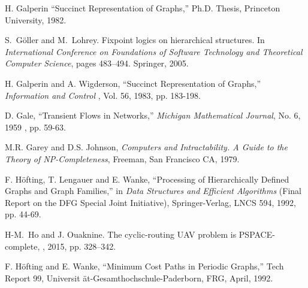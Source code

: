 \begin{thebibliography}{HMRR93}
 H. Galperin 
``Succinct Representation of Graphs,''
Ph.D. Thesis, Princeton University, 1982.


S.~G{\"o}ller and M.~Lohrey.
\newblock Fixpoint logics on hierarchical structures.
\newblock In {\em International Conference on Foundations of Software
  Technology and Theoretical Computer Science}, pages 483--494. Springer, 2005.



H. Galperin and A. Wigderson,
``Succinct Representation of Graphs,''
{\em Information and Control }, 
Vol. 56, 1983, pp. 183-198.






D. Gale,
``Transient Flows in Networks,''
{\em Michigan Mathematical Journal},
No. 6, 1959 , pp. 59-63.





M.R. Garey and  D.S. Johnson,
{\em Computers and Intractability. A Guide to the Theory of {NP}-Completeness},
Freeman, San Francisco CA, 1979.





\iffalse
\bibitem[HK87]{HK87} 
A. Habel and H.J. Kreowski,
`` May we Introduce to you: Hypergraph Languages Generated by 
Hyperedge Replacement,'' 
{\em Proc. 13th International 
Workshop on Graph-Theoretic Concepts in Computer Science (WG'87) }, 
Springer Verlag, LNCS, Vol. 291, 1987, pp. 15-26.
\fi




F. H\"ofting, T. Lengauer and E. Wanke,
``Processing of Hierarchically Defined Graphs and 
Graph Families,'' in
{\em Data Structures and Efficient Algorithms}
(Final Report on the DFG Special Joint Initiative),
Springer-Verlag, LNCS 594, 1992, pp. 44-69.

H-M.~Ho and J.  Ouaknine. 
\newblock The cyclic-routing UAV problem is {PSPACE}-complete,
, 2015, pp. 328--342.

F. H\"ofting and E. Wanke,
``Minimum Cost Paths in Periodic  Graphs,''
Tech Report 99, Universit \"at-Gesamthochschule-Paderborn, FRG,  
April, 1992. 




\end{thebibliography}
